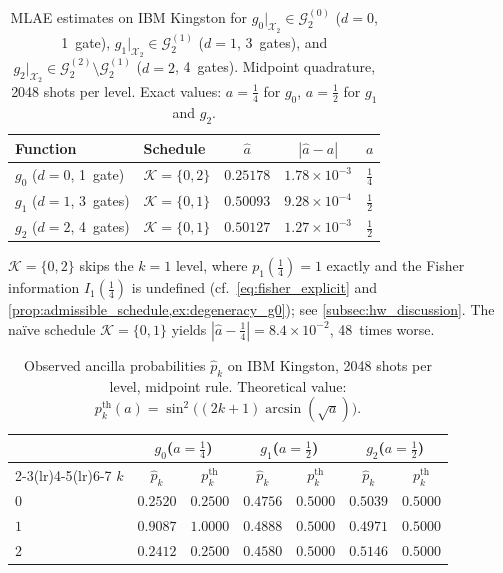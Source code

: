\documentclass[12pt,a4paper]{article}
\theoremstyle{plain}
\theoremstyle{definition}
\theoremstyle{remark}
\newcommand{\Gclass}[2]{\mathcal{G}_{#1}^{(#2)}}
\begin{document}
\begin{table}[h]
\centering
\caption{MLAE estimates on IBM Kingston for
  $g_0|_{\mathcal{X}_2}\in\Gclass{2}{0}$ ($d=0$, 1~gate),
  $g_1|_{\mathcal{X}_2}\in\Gclass{2}{1}$ ($d=1$, 3~gates), and
  $g_2|_{\mathcal{X}_2}\in\Gclass{2}{2}\setminus\Gclass{2}{1}$ ($d=2$, 4~gates).
  Midpoint quadrature, 2048 shots per level.
  Exact values: $a=\tfrac{1}{4}$ for $g_0$, $a=\tfrac{1}{2}$
  for $g_1$ and $g_2$.}
\label{tab:results_hw_kingston}
\renewcommand{\arraystretch}{1.3}
\begin{threeparttable}
\begin{tabular}{llccc}
\toprule
Function & Schedule & $\hat{a}$ & $|\hat{a}-a|$ & $a$ \\
\midrule
$g_0$ ($d=0$, 1~gate)  & $\mathcal{K}=\{0,2\}$\tnote{a}
  & $0.25178$ & $1.78\times10^{-3}$ & $\tfrac{1}{4}$ \\
$g_1$ ($d=1$, 3~gates) & $\mathcal{K}=\{0,1\}$
  & $0.50093$ & $9.28\times10^{-4}$ & $\tfrac{1}{2}$ \\
$g_2$ ($d=2$, 4~gates) & $\mathcal{K}=\{0,1\}$
  & $0.50127$ & $1.27\times10^{-3}$ & $\tfrac{1}{2}$ \\
\bottomrule
\end{tabular}
\begin{tablenotes}
\footnotesize
\item[a] $\mathcal{K}=\{0,2\}$ skips the $k=1$ level, where
  $p_1(\tfrac{1}{4})=1$ exactly and the Fisher information $I_1(\tfrac{1}{4})$
  is undefined (cf.\ \eqref{eq:fisher_explicit} and
  \cref{prop:admissible_schedule,ex:degeneracy_g0});
  see \cref{subsec:hw_discussion}.
  The na\"{i}ve schedule $\mathcal{K}=\{0,1\}$ yields
  $|\hat{a}-\tfrac{1}{4}|=8.4\times10^{-2}$, 48~times worse.
\end{tablenotes}
\end{threeparttable}
\end{table}

\begin{table}[h]
\centering
\caption{Observed ancilla probabilities $\hat{p}_k$ on IBM Kingston,
  2048 shots per level, midpoint rule.
  Theoretical value: $p_k^{\mathrm{th}}(a)=\sin^2\bigl((2k+1)\arcsin(\sqrt{a})\bigr)$.}
\label{tab:pk_kingston}
\renewcommand{\arraystretch}{1.3}
\begin{tabular}{lcccccc}
\toprule
& \multicolumn{2}{c}{$g_0$\;($a=\tfrac{1}{4}$)}
& \multicolumn{2}{c}{$g_1$\;($a=\tfrac{1}{2}$)}
& \multicolumn{2}{c}{$g_2$\;($a=\tfrac{1}{2}$)} \\
\cmidrule(lr){2-3}\cmidrule(lr){4-5}\cmidrule(lr){6-7}
$k$ & $\hat{p}_k$ & $p_k^{\mathrm{th}}$
    & $\hat{p}_k$ & $p_k^{\mathrm{th}}$
    & $\hat{p}_k$ & $p_k^{\mathrm{th}}$ \\
\midrule
$0$ & $0.2520$ & $0.2500$ & $0.4756$ & $0.5000$ & $0.5039$ & $0.5000$ \\
$1$ & $0.9087$ & $1.0000$ & $0.4888$ & $0.5000$ & $0.4971$ & $0.5000$ \\
$2$ & $0.2412$ & $0.2500$ & $0.4580$ & $0.5000$ & $0.5146$ & $0.5000$ \\
\bottomrule
\end{tabular}
\end{table}
\end{document}
